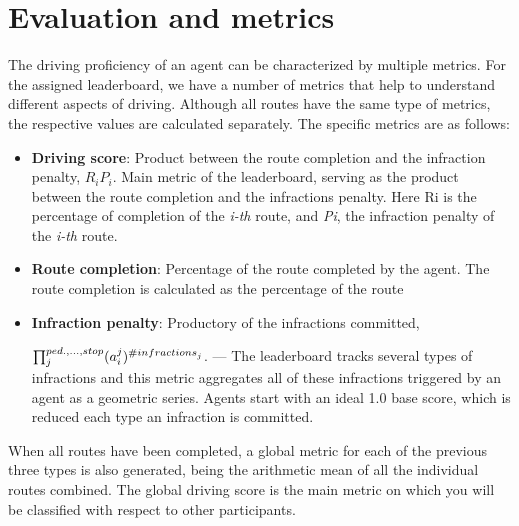 \documentclass{article}
\begin{document}
\section{Evaluation and metrics}
The driving proficiency of an agent can be characterized by multiple metrics. For the assigned leaderboard, we have a number of metrics that help 
to understand different aspects of driving. Although all routes have the same type of metrics, the respective values are calculated separately. 
The specific metrics are as follows:
\begin{itemize}
  \item \textbf{Driving score}: Product between the route completion and the infraction penalty, $R_i P_i$. Main metric of the leaderboard, 
  serving as the product between the route completion and the infractions penalty. Here Ri is the percentage of completion of the \textit{i-th} route, and \textit{Pi}, 
  the infraction penalty of the \textit{i-th} route.
  \item \textbf{Route completion}: Percentage of the route completed by the agent. The route completion is calculated as the percentage of the route
  \item \textbf{Infraction penalty}: Productory of the infractions committed, 

  
  $\prod_{j}^{ped., ..., stop} (a_{\small{i}}^{\small{j}})^{\small{\#infractions}_j}$. — 
  The leaderboard tracks several types of infractions and this metric aggregates all of these infractions triggered by an agent as a geometric series. Agents start with an ideal 1.0 
  base score, which is reduced each type an infraction is committed.
\end{itemize}
When all routes have been completed, a global metric for each of the previous three types is also generated, being the arithmetic mean of all the individual routes combined. 
The global driving score is the main metric on which you will be classified with respect to other participants.
\end{document}

